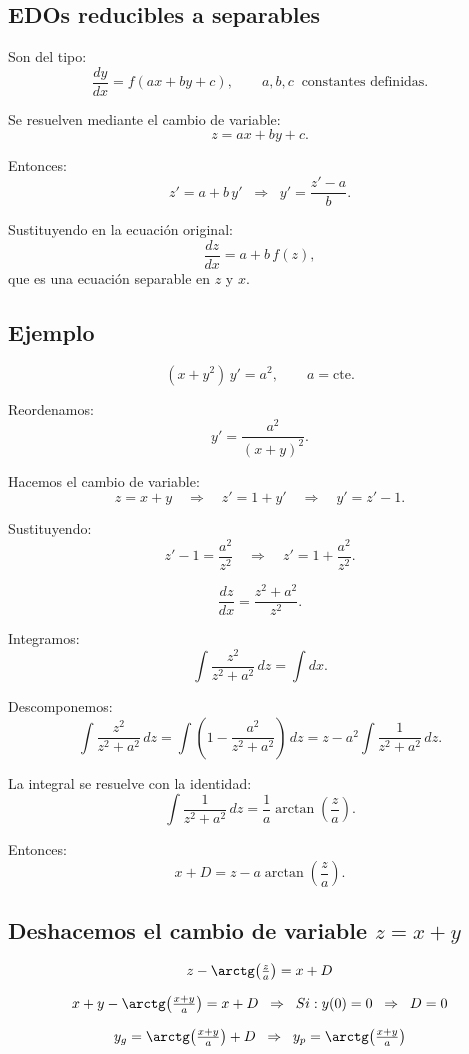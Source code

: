 \documentclass[a4paper,12pt]{article}
\begin{document}
\subsection{EDOs reducibles a separables}

Son del tipo:
\[
\frac{dy}{dx} = f(ax+by+c),
\qquad a,b,c \;\; \text{constantes definidas}.
\]

Se resuelven mediante el cambio de variable:
\[
z = ax + by + c.
\]

Entonces:
\[
z' = a + b\,y' 
\;\;\Rightarrow\;\; 
y' = \frac{z'-a}{b}.
\]

Sustituyendo en la ecuación original:
\[
\frac{dz}{dx} = a + b\,f(z),
\]
que es una ecuación separable en $z$ y $x$.

\bigskip

\subsection*{Ejemplo}

\[
(x+y^2)\,y' = a^2, \qquad a = \text{cte}.
\]

Reordenamos:
\[
y' = \frac{a^2}{(x+y)^2}.
\]

Hacemos el cambio de variable:
\[
z = x+y \quad\Rightarrow\quad z' = 1 + y' \quad\Rightarrow\quad y' = z'-1.
\]

Sustituyendo:
\[
z'-1 = \frac{a^2}{z^2} \quad\Rightarrow\quad z' = 1 + \frac{a^2}{z^2}.
\]

\[
\frac{dz}{dx} = \frac{z^2+a^2}{z^2}.
\]

Integramos:
\[
\int \frac{z^2}{z^2+a^2}\,dz = \int dx.
\]

Descomponemos:
\[
\int \frac{z^2}{z^2+a^2}\,dz 
= \int \left(1 - \frac{a^2}{z^2+a^2}\right)\,dz
= z - a^2\int \frac{1}{z^2+a^2}\,dz.
\]

La integral se resuelve con la identidad:
\[
\int \frac{1}{z^2+a^2}\,dz = \frac{1}{a}\arctan\!\left(\frac{z}{a}\right).
\]

Entonces:
\[
x + D = z - a\arctan\!\left(\frac{z}{a}\right).
\]
\subsection*{Deshacemos el cambio de variable $z = x+y$}

\[
z - \arctg\!\left(\tfrac{z}{a}\right) = x + D
\]

\[
x+y - \arctg\!\left(\tfrac{x+y}{a}\right) = x + D
\;\;\Rightarrow\;\; 
Si: y(0)=0 \;\;\Rightarrow\;\; D=0
\]

\[
y_g = \arctg\!\left(\tfrac{x+y}{a}\right) + D 
\;\;\Rightarrow\;\;
y_p = \arctg\!\left(\tfrac{x+y}{a}\right)
\]
\end{document}
